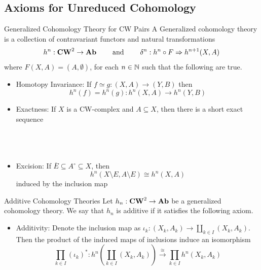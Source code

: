 \documentclass[a4paper]{article}
\begin{document}
\subsection{Axioms for Unreduced Cohomology}
\begin{defn}{Generalized Cohomology Theory for CW Pairs}{} A Generalized cohomology theory is a collection of contravariant functors and natural transformations $$h^n:\bold{CW}^2\to\bold{Ab}\;\;\;\;\;\;\;\text{ and }\;\;\;\;\;\;\;\delta^n:h^n\circ F\Rightarrow h^{n+1}(X,A)$$ where $F(X,A)=(A,\emptyset)$, for each $n\in\mathbb{N}$ such that the following are true. 
\begin{itemize}
\item Homotopy Invariance: If $f\simeq g:(X,A)\to(Y,B)$ then $$h^n(f)=h^n(g):h^n(X,A)\to h^n(Y,B)$$
\item Exactness: If $X$ is a CW-complex and $A\subseteq X$, then there is a short exact sequence \\~\\
\\~\\
\item Excision: If $\overline{E}\subseteq A^\circ\subseteq X$, then $$h^n(X\setminus E,A\setminus E)\cong h^n(X,A)$$ induced by the inclusion map
\end{itemize}
\end{defn}

\begin{defn}{Additive Cohomology Theories}{} Let $h_n:\bold{CW}^2\to\bold{Ab}$ be a generalized cohomology theory. We say that $h_n$ is additive if it satisfies the following axiom. 
\begin{itemize}
\item Additivity: Denote the inclusion map as $\iota_k:(X_k,A_k)\to\coprod_{k\in I}(X_k,A_k)$. Then the product of the induced maps of inclusions induce an isomorphism $$\prod_{k\in I}(\iota_k)^\ast:h^n\left(\coprod_{k\in I}(X_k,A_k)\right)\overset{\cong}{\longrightarrow}\prod_{k\in I}h^n(X_k,A_k)$$
\end{itemize}
\end{defn}
\end{document}
